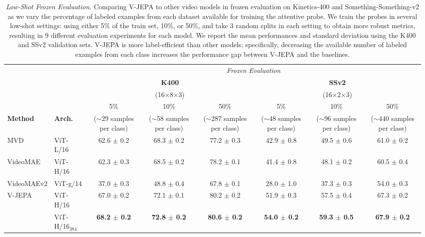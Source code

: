\documentclass[twocolumn]{fairmeta}
\newcommand{\putalg}{{\small V-JEPA}\xspace}
\newcommand{\cc}{\cellcolor{metabg}}
\theoremstyle{plain}
\theoremstyle{definition}
\theoremstyle{remark}
\begin{document}
\begin{table}[t]
    \centering
    {\fontsize{7pt}{7pt}\selectfont
    \caption{{\it Low-Shot Frozen Evaluation.} 
        Comparing \putalg to other video models in frozen evaluation on Kinetics-400 and Something-Something-v2 as we vary the percentage of labeled examples from each dataset available for training the attentive probe.
        We train the probes in several low-shot settings: using either 5\% of the train set, 10\%, or 50\%, and take 3 random splits in each setting to obtain more robust metrics, resulting in 9 different evaluation experiments for each model.
        We report the mean performances and standard deviation using the K400 and SSv2 validation sets.
        \putalg is more label-efficient than other models; specifically, decreasing the available number of labeled examples from each class increases the performance gap between \putalg and the baselines.}
    \label{tb:lowshot}
    \begin{tabular}{ll ccc ccc}
        \toprule
        & & \multicolumn{6}{c}{\it Frozen Evaluation} \\[1ex]
        & & \multicolumn{3}{c}{\bf K400} & \multicolumn{3}{c}{\bf SSv2} \\
        & & \multicolumn{3}{c}{\fontsize{5.5pt}{5.5pt}\selectfont(16$\times$8$\times$3)} & \multicolumn{3}{c}{\fontsize{5.5pt}{5.5pt}\selectfont(16$\times$2$\times$3)} \\
        \cmidrule(l){3-5} \cmidrule(l){6-8}
        & & 5\% & 10\% & 50\% & 5\% & 10\% & 50\% \\
        \bf Method & \bf Arch. & \fontsize{5.5pt}{5.5pt}\selectfont($\sim$29 samples per class) & \fontsize{5.5pt}{5.5pt}\selectfont($\sim$58 samples per class) & \fontsize{5.5pt}{5.5pt}\selectfont($\sim$287 samples per class) & \fontsize{5.5pt}{5.5pt}\selectfont($\sim$48 samples per class) & \fontsize{5.5pt}{5.5pt}\selectfont($\sim$96 samples per class) & \fontsize{5.5pt}{5.5pt}\selectfont($\sim$440 samples per class) \\
        \midrule
        MVD & ViT-L/16 & 62.6 $\pm$ 0.2 & 68.3 $\pm$ 0.2 & 77.2 $\pm$ 0.3 & 42.9 $\pm$ 0.8 & 49.5 $\pm$ 0.6 & 61.0 $\pm$ 0.2 \\
        VideoMAE & ViT-H/16 & 62.3 $\pm$ 0.3 & 68.5 $\pm$ 0.2 & 78.2 $\pm$ 0.1 & 41.4 $\pm$ 0.8 & 48.1 $\pm$ 0.2 & 60.5 $\pm$ 0.4 \\
        VideoMAEv2 & ViT-g/14 & 37.0 $\pm$ 0.3 & 48.8 $\pm$ 0.4 & 67.8 $\pm$ 0.1 & 28.0 $\pm$ 1.0 & 37.3 $\pm$ 0.3 & 54.0 $\pm$ 0.3 \\
        \midrule
        \multirow{2}{*}{V-JEPA} & ViT-H/16 & \cc 67.0 $\pm$ 0.2 & \cc 72.1 $\pm$ 0.1 & \cc 80.2 $\pm$ 0.2 & \cc 51.9 $\pm$ 0.3 & \cc 57.5 $\pm$ 0.4 & \cc 67.3 $\pm$ 0.2 \\
        & ViT-H/16$_{384}$ & \bf\cc 68.2 $\pm$ 0.2 & \cc\bf 72.8 $\pm$ 0.2 & \bf\cc 80.6 $\pm$ 0.2 &\bf\cc  54.0 $\pm$ 0.2 & \bf\cc 59.3 $\pm$ 0.5 & \bf\cc 67.9 $\pm$ 0.2 \\
        \bottomrule
    \end{tabular}}
\end{table}
\end{document}

